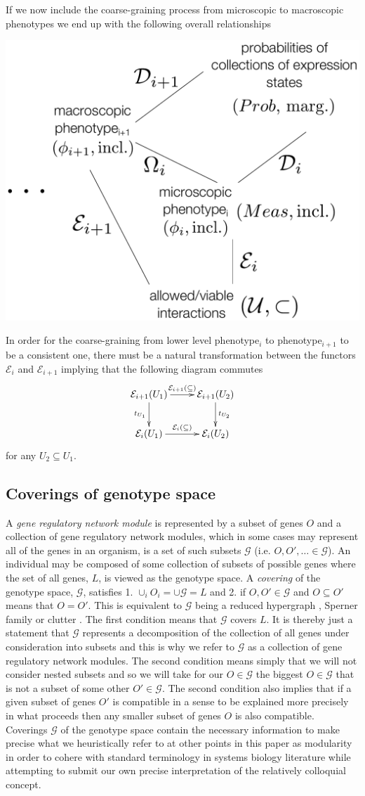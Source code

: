 If we now include the coarse-graining process from microscopic to macroscopic phenotypes we end up with the following overall relationships
\begin{center}
\includegraphics[width=0.4\columnwidth]{fig/abstractroadmap.pdf}
\end{center}
In order for the coarse-graining from lower level phenotype$_i$ to phenotype$_{i+1}$ to be a consistent one, there must be a natural transformation between the functors $\mathcal{E}_i$ and $\mathcal{E}_{i+1}$ implying that the following diagram commutes
$$
\xymatrix{
\mathcal{E}_{i+1}(U_1) \ar[r]^{\mathcal{E}_{i+1}(\subseteq)} \ar[d]_{t_{U_1}} & \mathcal{E}_{i+1}(U_2) \ar[d]^{t_{U_2}} \\
\mathcal{E}_{i}(U_1) \ar[r]^{\mathcal{E}_{i}(\subseteq)} & \mathcal{E}_{i}(U_2) }
$$
for any $U_2 \subseteq U_1$.

\subsection{Coverings of genotype space}\label{sec:covergenotypespace}
A \emph{gene regulatory network module} is represented by a subset of genes $O$ and a collection of gene regulatory network modules, which in some cases may represent all of the genes in an organism, is a set of such subsets $\mathcal{G}$ (i.e. $O,O',\ldots \in \mathcal{G}$). An individual may be composed of some collection of subsets of possible genes where the set of all genes, $L$, is viewed as the genotype space. A \emph{covering} of the genotype space, $\mathcal{G}$, satisfies 1. $\cup_i O_i = \cup \mathcal{G} = L$ and 2. if $O,O' \in \mathcal{G}$ and $O \subseteq O'$ means that $O = O'$. This is equivalent to $\mathcal{G}$ being a reduced hypergraph , Sperner family or clutter \cite{Lauritzen1996}. The first condition means that $\mathcal{G}$ covers $L$. It is thereby just a statement that $\mathcal{G}$ represents a decomposition of the collection of all genes under consideration into subsets and this is why we refer to $\mathcal{G}$ as a collection of gene regulatory network modules. The second condition means simply that we will not consider nested subsets and so we will take for our $O \in \mathcal{G}$ the biggest $O \in \mathcal{G}$ that is not a subset of some other $O' \in \mathcal{G}$. The second condition also implies that if a given subset of genes $O'$ is compatible in a sense to be explained more precisely in what proceeds then any smaller subset of genes $O$ is also compatible. Coverings $\mathcal{G}$ of the genotype space contain the necessary information to make precise what we heuristically refer to at other points in this paper as modularity in order to cohere with standard terminology in systems biology literature while attempting to submit our own precise interpretation of the relatively colloquial concept.

